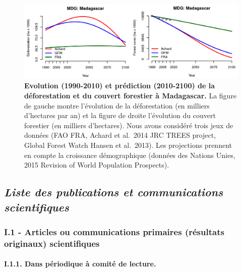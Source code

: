 \documentclass[12pt,]{article}
\let\oldparagraph\paragraph
\renewcommand{\paragraph}[1]{\oldparagraph{#1}\mbox{}}
\begin{document}
\begin{figure}[H]

{\centering \includegraphics[width=\textwidth]{figures/deforMada} 

}

\caption{\textbf{Evolution (1990-2010) et prédiction
(2010-2100) de la déforestation et du couvert forestier à Madagascar.}
La figure de gauche montre l'évolution de la déforestation (en milliers
d'hectares par an) et la figure de droite l'évolution du couvert
forestier (en milliers d'hectares). Nous avons considéré trois jeux de
données (FAO FRA, Achard et al.~2014 JRC TREES project, Global Forest
Watch Hansen et al.~2013). Les projections prennent en compte la
croissance démographique (données des Nations Unies, 2015 Revision of
World Population Prospects).}\label{fig:intensity}
\end{figure}

\hypertarget{liste-des-publications-et-communications-scientifiques}{%
\subsection{\texorpdfstring{\emph{Liste des publications et
communications
scientifiques}}{Liste des publications et communications scientifiques}}\label{liste-des-publications-et-communications-scientifiques}}

\hypertarget{i.1---articles-ou-communications-primaires-resultats-originaux-scientifiques}{%
\subsubsection{I.1 - Articles ou communications primaires (résultats
originaux)
scientifiques}\label{i.1---articles-ou-communications-primaires-resultats-originaux-scientifiques}}

\hypertarget{i.1.1.-dans-periodique-a-comite-de-lecture.}{%
\paragraph{I.1.1. Dans périodique à comité de
lecture.}\label{i.1.1.-dans-periodique-a-comite-de-lecture.}}
\end{document}
